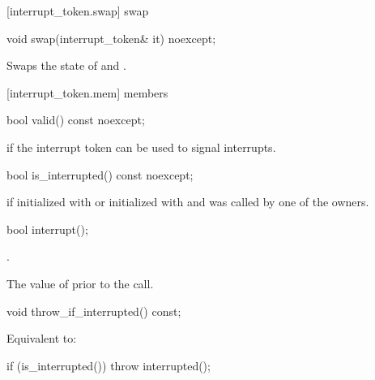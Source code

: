 {%
[interrupt_token.swap]{ swap}

%
\begin{itemdecl}
void swap(interrupt_token& it) noexcept;
\end{itemdecl}

\begin{itemdescr}
\pnum
\effects Swaps the state of  and .
\end{itemdescr}


[interrupt_token.mem]{ members}

%
\begin{itemdecl}
bool valid() const noexcept;
\end{itemdecl}
\begin{itemdescr}
  \pnum\returns {} if the interrupt token can be used to signal interrupts.
\end{itemdescr}

%
\begin{itemdecl}
bool is_interrupted() const noexcept;
\end{itemdecl}
\begin{itemdescr}
  \pnum\returns {} if initialized with 
                or initialized with  and  was called
                by one of the owners.
\end{itemdescr}

%
\begin{itemdecl}
bool interrupt();
\end{itemdecl}
\begin{itemdescr}
  \pnum\requires {}

  \pnum\effects {}.

  \pnum\returns The value of  prior to the call.
\end{itemdescr}

%
\begin{itemdecl}
void throw_if_interrupted() const;
\end{itemdecl}
\begin{itemdescr}
  \pnum\effects Equivalent to:
\begin{codeblock}
if (is_interrupted())
  throw interrupted();
\end{codeblock}
\end{itemdescr}


}
